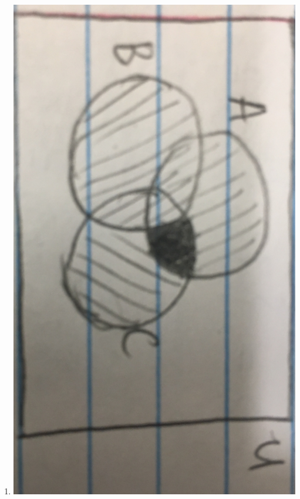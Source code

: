 \documentclass{article}
\theoremstyle{definition}
\begin{document}
\begin{enumerate}[label = \alph*)]
    \item
    \includegraphics[scale = .05, angle = 90]{partC}
\end{enumerate}
\end{document}
